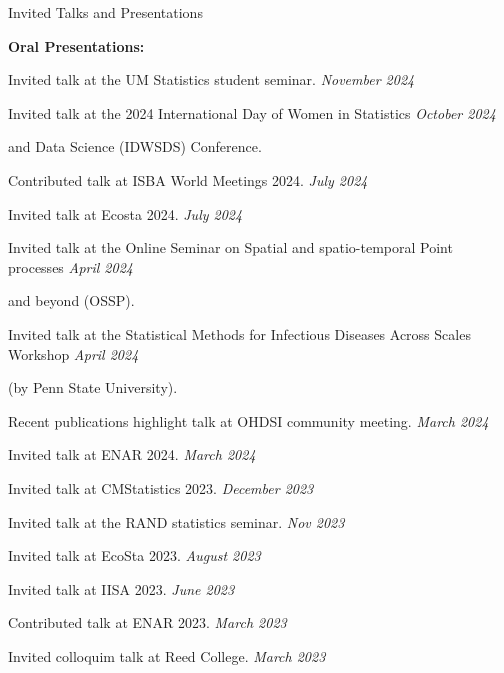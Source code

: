 \documentclass{resume} %
\begin{document}
\begin{rSection}{Invited Talks and Presentations}
	
	\hspace{-.2in} {\textbf{Oral Presentations:}}
	
	
	Invited talk at the UM Statistics student seminar.  \hfill {\em November 2024} 
	
	Invited talk at the 2024 International Day of Women  in Statistics 
	 \hfill {\em October 2024} 
	 
	\vspace{-0.1in} 
	and Data Science (IDWSDS) Conference. 
	
	Contributed talk at ISBA World Meetings 2024.  \hfill {\em July 2024}
	
	Invited talk at Ecosta 2024.  \hfill {\em July 2024}
	
	Invited talk at the Online Seminar on Spatial and spatio-temporal Point processes   \hfill {\em April 2024}
	
	\vspace{-0.1in} 
	and beyond (OSSP).
	
	Invited talk at the Statistical Methods for Infectious Diseases Across Scales Workshop \hfill {\em April 2024}
	
	\vspace{-0.1in}
	(by Penn State University).
	
	Recent publications highlight talk at OHDSI community meeting. \hfill {\em March 2024}
	
	Invited talk at ENAR 2024.  \hfill {\em March 2024}
	
	Invited talk at CMStatistics 2023. \hfill {\em December 2023}
	
	Invited talk at the RAND statistics seminar. \hfill {\em Nov 2023}
	
	Invited talk at EcoSta 2023. \hfill {\em August 2023}
	
	Invited talk at IISA 2023.  \hfill {\em June 2023}
	
	
	Contributed talk at ENAR 2023. \hfill {\em March 2023}
	
	Invited colloquim talk at Reed College. \hfill {\em March 2023}
	

\end{rSection}
\end{document}
